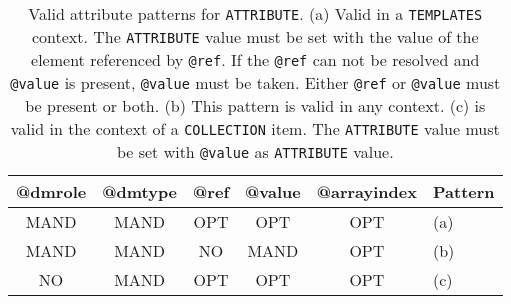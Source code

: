 \begin{table}[!htbp]
\small
\centering
\begin{tabulary}{\linewidth}{|c|c|c|c|c|J|}
    \hline 
        \textbf{@dmrole} &
        \textbf{@dmtype} &
        \textbf{@ref} &
        \textbf{@value} &
        \textbf{@arrayindex} &
        \textbf{Pattern}\\
    \hline     
    \hline  
        MAND &           
        MAND &           
        OPT &           
        OPT &           
        OPT &   
        (a)\\
    \hline   
        MAND &           
        MAND &           
        NO &           
        MAND &           
        OPT &   
        (b)\\
    \hline  
        NO &           
        MAND &           
        OPT &           
        OPT &           
        OPT &   
        (c) \\
   \hline 
\end{tabulary}
     \caption{Valid attribute patterns for \texttt{ATTRIBUTE}. (a) Valid in a \texttt{TEMPLATES} context.        
        The \texttt{ATTRIBUTE} value must be set with the value of the element referenced by \texttt{@ref}. 
        If the \texttt{@ref} can not be resolved and \texttt{@value} is present, \texttt{@value} must be taken. Either \texttt{@ref} or \texttt{@value} must be present or both. (b) This pattern 
        is valid in any context.  (c) is valid in the context of a \texttt{COLLECTION} item.    
        The \texttt{ATTRIBUTE} value must be set with \texttt{@value} as \texttt{ATTRIBUTE} value.} 
     \label{tbl:attribute-pattern}
 \end{table}
